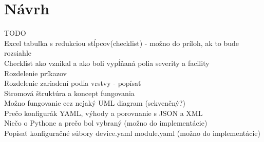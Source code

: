 \chapter{Návrh}

TODO\\
Excel tabuľka s redukciou stĺpcov(checklist) - možno do príloh, ak to bude rozsiahle\\
Checklist ako vznikal a ako boli vypĺňaná polia severity a facility\\
Rozdelenie príkazov\\
Rozdelenie zariadení podľa vrstvy - popísať\\
Stromová štruktúra a koncept fungovania\\
Možno fungovanie cez nejaký UML diagram (sekvenčný?)\\
Prečo konfigurák YAML, výhody a porovnanie s JSON a XML\\
Niečo o Pythone a prečo bol vybraný (možno do implementácie)\\
Popísať konfiguračné súbory device.yaml module.yaml (možno do implementácie)\\
